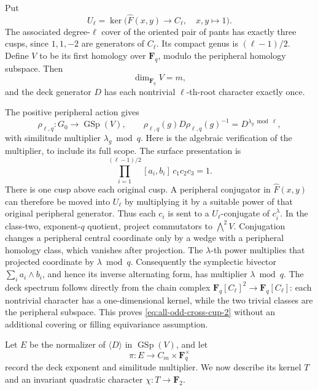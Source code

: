 Put
\[
 U_\ell=\ker\bigl(\widehat F(x,y)\to C_\ell,\quad x,y\mapsto1\bigr).
\]
The associated degree-\(\ell\) cover of the oriented
pair of pants has exactly three cusps, since
\(1,1,-2\) are generators of \(C_\ell\).
Its compact genus is \((\ell-1)/2\).
Define \(V\) to be its first homology over \(\mathbf F_q\),
modulo the peripheral homology subspace.
Then
\[
 \dim_{\mathbf F_q}V=m,
\]
and the deck generator \(D\) has each nontrivial
\(\ell\)-th-root character exactly once.

The positive peripheral action gives
\begin{equation}
 \rho_{\ell,q}:G_0\to\operatorname{GSp}(V),\qquad
 \rho_{\ell,q}(g)D\rho_{\ell,q}(g)^{-1}
                  =D^{\lambda_g\bmod\ell},                \label{eq:all-odd-cross-cup-2}
\end{equation}
with similitude multiplier \(\lambda_g\bmod q\).
Here is the algebraic verification of the multiplier,
to include its full scope. The surface presentation is
\[
       \prod_{i=1}^{(\ell-1)/2}[a_i,b_i]\,c_1c_2c_3=1 .
\]
There is one cusp above each original cusp.
A peripheral conjugator in \(\widehat F(x,y)\) can
therefore be moved into \(U_\ell\) by multiplying it by
a suitable power of that original peripheral generator.
Thus each \(c_i\) is sent to a \(U_\ell\)-conjugate of
\(c_i^\lambda\).
In the class-two, exponent-\(q\) quotient, project
commutators to \(\bigwedge^2 V\).
Conjugation changes a peripheral central coordinate
only by a wedge with a peripheral homology class,
which vanishes after projection.
The \(\lambda\)-th power multiplies that projected
coordinate by \(\lambda\bmod q\).
Consequently the symplectic bivector
\(\sum_i a_i\wedge b_i\), and hence its inverse alternating
form, has multiplier \(\lambda\bmod q\).
The deck spectrum follows directly from the chain
complex \(\mathbf F_q[C_\ell]^2\to\mathbf F_q[C_\ell]\):
each nontrivial character has a one-dimensional kernel,
while the two trivial classes are the peripheral subspace.
This proves \eqref{eq:all-odd-cross-cup-2} without an additional covering or filling
equivariance assumption.

Let \(E\) be the normalizer of \(\langle D\rangle\)
in \(\operatorname{GSp}(V)\), and let
\begin{equation}
                 \pi:E\to C_m\times\mathbf F_q^\times
                                                               \label{eq:all-odd-cross-cup-3}
\end{equation}
record the deck exponent and similitude multiplier.
We now describe its kernel \(T\) and an invariant
quadratic character \(\chi:T\to\mathbf F_2\).

